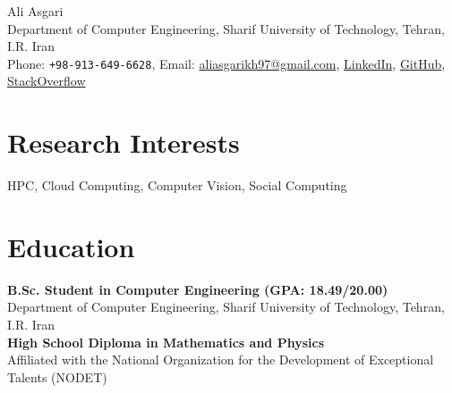 \documentclass[10pt, a4paper]{article}
\newcommand{\years}[1]{\marginnote{\scriptsize #1}}
\begin{document}
{\LARGE Ali Asgari}\\[1cm]
Department of Computer Engineering, Sharif University of Technology, Tehran, I.R. Iran\\[.2cm]
Phone: \texttt{+98-913-649-6628}, Email: \href{mailto:aliasgarikh97@gmail.com}{aliasgarikh97@gmail.com},  \href{https://www.linkedin.com/in/ali-asgari-51981884/}{LinkedIn}, \href{https://github.com/altostratous}{GitHub}, \href{https://stackoverflow.com/users/2656621/ali-asgari?tab=profile}{StackOverflow}\\ 


\section*{Research Interests}
HPC, Cloud Computing, Computer Vision, Social Computing


\section*{Education}
\noindent
\years{2015-Now}\textbf{B.Sc. Student in Computer Engineering (GPA: 18.49/20.00)}\\
Department of Computer Engineering, Sharif University of Technology, Tehran, I.R. Iran\\
\years{2012-2015}\textbf{High School Diploma in Mathematics and Physics}\\
Affiliated  with the National Organization for the Development of Exceptional Talents (NODET)
\end{document}
